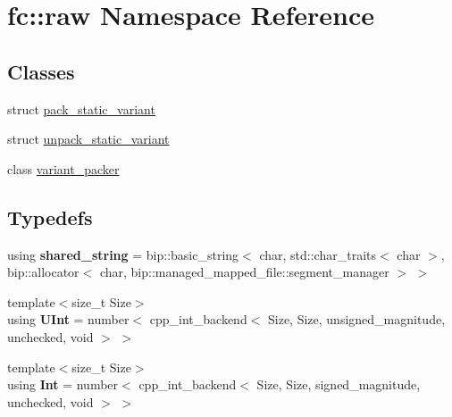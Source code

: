 \hypertarget{namespacefc_1_1raw}{}\section{fc\+:\+:raw Namespace Reference}
\label{namespacefc_1_1raw}
\subsection*{Classes}
\begin{DoxyCompactItemize}
\item 
struct \mbox{\hyperlink{structfc_1_1raw_1_1pack__static__variant}{pack\+\_\+static\+\_\+variant}}
\item 
struct \mbox{\hyperlink{structfc_1_1raw_1_1unpack__static__variant}{unpack\+\_\+static\+\_\+variant}}
\item 
class \mbox{\hyperlink{classfc_1_1raw_1_1variant__packer}{variant\+\_\+packer}}
\end{DoxyCompactItemize}
\subsection*{Typedefs}
\begin{DoxyCompactItemize}
\item 
\mbox{\label{namespacefc_1_1raw_ac726d9dae35b1f7353f80a1ffe4a8dc8}} 
using {\bfseries shared\+\_\+string} = bip\+::basic\+\_\+string$<$ char, std\+::char\+\_\+traits$<$ char $>$, bip\+::allocator$<$ char, bip\+::managed\+\_\+mapped\+\_\+file\+::segment\+\_\+manager $>$ $>$
\item 
\mbox{\label{namespacefc_1_1raw_a25e59692ccd4201252c46be50c5b054b}} 
{\footnotesize template$<$size\+\_\+t Size$>$ }\\using {\bfseries U\+Int} = number$<$ cpp\+\_\+int\+\_\+backend$<$ Size, Size, unsigned\+\_\+magnitude, unchecked, void $>$ $>$
\item 
\mbox{\label{namespacefc_1_1raw_a03796b035ac94b735a1293f087931bf0}} 
{\footnotesize template$<$size\+\_\+t Size$>$ }\\using {\bfseries Int} = number$<$ cpp\+\_\+int\+\_\+backend$<$ Size, Size, signed\+\_\+magnitude, unchecked, void $>$ $>$
\end{DoxyCompactItemize}
